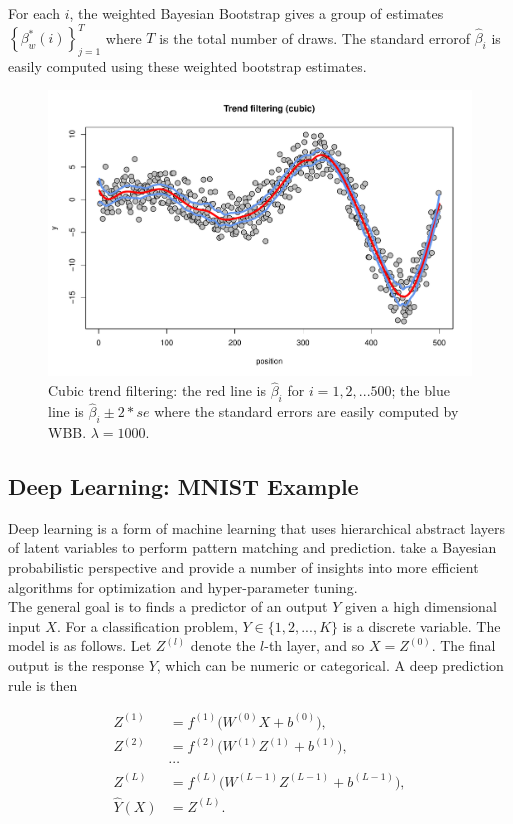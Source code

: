 \documentclass[11pt]{article}%
\begin{document}
\noindent For each $i$, the weighted Bayesian Bootstrap gives a group of estimates $\left\{\beta_w^*(i) \right\}_{j=1}^T$ where $T$ is the total number of draws. The standard errorof $\hat\beta_i$ is easily computed using these weighted bootstrap estimates.
\begin{figure}[ht]
\centering 
\includegraphics[scale=0.55]{filtering.pdf} 
\caption{Cubic trend filtering: the red line is $\hat\beta_i$ for $i=1,2,...500$; the blue line is $\hat\beta_i \pm 2*se$ where the standard errors are easily computed by WBB. $\lambda = 1000$.}
\label{filter}
\end{figure}


\subsection{Deep Learning: MNIST Example}
Deep learning is a form of machine learning that uses hierarchical abstract layers of latent variables to perform pattern matching and prediction. \cite{polson2017deep} take a Bayesian probabilistic perspective and provide a number of insights into more efficient algorithms for optimization
and hyper-parameter tuning.\\

\noindent The general goal is to finds a predictor of an output $Y$ given a high dimensional input $X$. For a classification problem, $Y \in \{1, 2, ..., K\}$ is a discrete variable. The model is as follows. Let $Z^{(l)}$ denote the $l$-th layer, and so $X = Z^{(0)}$. The final output is the response $Y$,
which can be numeric or categorical. A deep prediction rule is then 

\begin{align*}
Z^{(1)} & = f^{(1)} \Big( W^{(0)} X + b^{(0)} \Big),\\
Z^{(2)} & = f^{(2)} \Big( W^{(1)} Z^{(1)} + b^{(1)} \Big),\\
& \cdots \\
Z^{(L)} & = f^{(L)} \Big( W^{(L-1)} Z^{(L-1)} + b^{(L-1)} \Big),\\
\hat{Y} (X) & = Z^{(L)}.
\end{align*}
\end{document}
